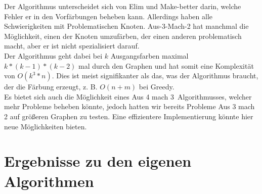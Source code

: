 \documentclass[11pt]{article}
\begin{document}
Der Algorithmus unterscheidet sich von Elim und Make-better darin, welche Fehler er in den Vorfärbungen beheben kann. Allerdings haben alle Schwierigkeiten mit Problematischen Knoten.
Aus-3-Mach-2 hat manchmal die Möglichkeit, einen der Knoten umzufärben, der einen anderen problematisch macht, aber er ist nicht spezialisiert darauf. \\

Der Algorithmus geht dabei bei $k$ Ausgangsfarben maximal $k*(k-1)*(k-2)$ mal durch den Graphen und hat somit eine Komplexität von $O(k^3*n)$.
Dies ist meist signifikanter als das, was der Algorithmus braucht, der die Färbung erzeugt, z. B. $O(n+m)$ bei Greedy. \\
Es bietet sich auch die Möglichkeit eines \grqq Aus 4 mach 3\grqq\ Algorithmusses,
welcher mehr Probleme beheben könnte, jedoch hatten wir bereits Probleme Aus 3 mach 2 auf größeren Graphen zu testen.
Eine effizientere Implementierung könnte hier neue Möglichkeiten bieten.

\section{Ergebnisse zu den eigenen Algorithmen}
\end{document}

